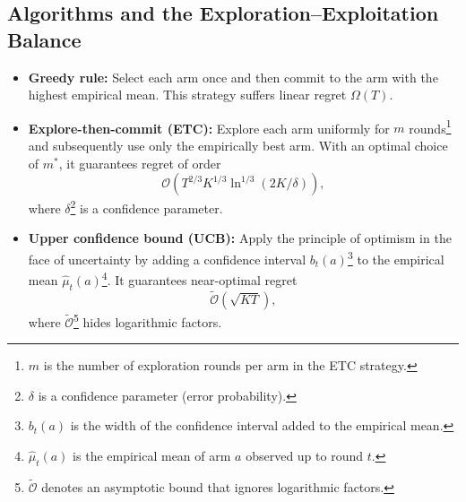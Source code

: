 \subsection{Algorithms and the Exploration--Exploitation Balance}
\begin{itemize}
    \item \textbf{Greedy rule:} Select each arm once and then commit to the arm with the highest empirical mean. This strategy suffers linear regret \(\Omega(T)\).
    \item \textbf{Explore-then-commit (ETC):} Explore each arm uniformly for \(m\) rounds\footnote{\(m\) is the number of exploration rounds per arm in the ETC strategy.} and subsequently use only the empirically best arm. With an optimal choice of \(m^*\), it guarantees regret of order
    \[
        \mathcal{O}\!\left(T^{2/3} K^{1/3} \ln^{1/3}(2K/\delta)\right),
    \]
    where \(\delta\)\footnote{\(\delta\) is a confidence parameter (error probability).} is a confidence parameter.
    \item \textbf{Upper confidence bound (UCB):} Apply the principle of optimism in the face of uncertainty by adding a confidence interval \(b_t(a)\)\footnote{\(b_t(a)\) is the width of the confidence interval added to the empirical mean.} to the empirical mean \(\hat{\mu}_t(a)\)\footnote{\(\hat{\mu}_t(a)\) is the empirical mean of arm \(a\) observed up to round \(t\).}. It guarantees near-optimal regret
    \[
        \tilde{\mathcal{O}}\!\left(\sqrt{KT}\right),
    \]
    where \(\tilde{\mathcal{O}}\)\footnote{\(\tilde{\mathcal{O}}\) denotes an asymptotic bound that ignores logarithmic factors.} hides logarithmic factors.
\end{itemize}